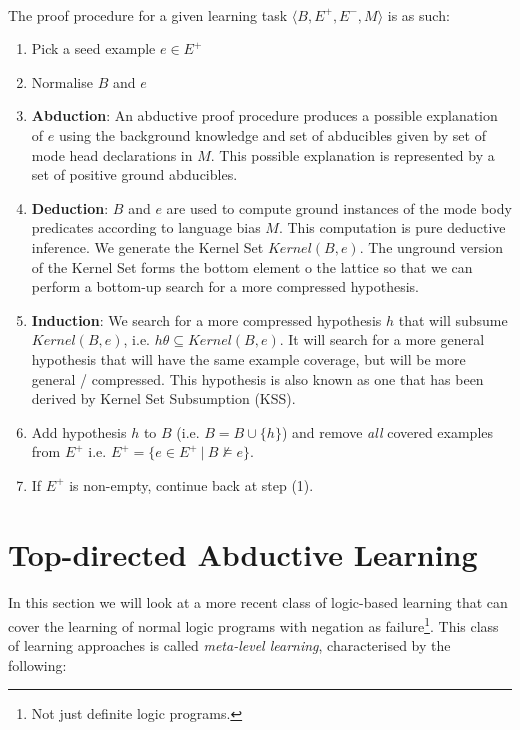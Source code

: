 \documentclass{article}
\theoremstyle{plain}
\theoremstyle{definition}
\begin{document}
\begin{multicols}{2}
\paragraph{} The proof procedure for a given learning task $\langle B, E^+, E^-, M\rangle$ is as such:
\begin{enumerate}
\item Pick a seed example $e \in E^+$
\item Normalise $B$ and $e$
\item \textbf{Abduction}: An abductive proof procedure produces a possible explanation of $e$ using the background knowledge and set of abducibles given by set of mode head declarations in $M$. This possible explanation is represented by a set of positive ground abducibles. 
\item \textbf{Deduction}: $B$ and $e$ are used to compute ground instances of the mode body predicates according to language bias $M$. This computation is pure deductive inference. We generate the Kernel Set $Kernel(B, e)$. The unground version of the Kernel Set forms the bottom element o the lattice so that we can perform a bottom-up search for a more compressed hypothesis. 
\item \textbf{Induction}: We search for a more compressed hypothesis $h$ that will subsume $Kernel(B, e)$, i.e. $h\theta \subseteq Kernel(B, e)$. It will search for a more general hypothesis that will have the same example coverage, but will be more general / compressed. This hypothesis is also known as one that has been derived by Kernel Set Subsumption (KSS).
\item Add hypothesis $h$ to $B$ (i.e. $B = B \cup \{h\}$) and remove \textit{all} covered examples from $E^+$ i.e. $E^+ = \{e \in E^+\ |\ B \not\models e\}$.
\item If $E^+$ is non-empty, continue back at step (1).
\end{enumerate}

\section{Top-directed Abductive Learning}

\paragraph{} In this section we will look at a more recent class of logic-based learning that can cover the learning of normal logic programs with negation as failure\footnote{Not just definite logic programs.}. This class of learning approaches is called \textit{meta-level learning}, characterised by the following:


\end{multicols}
\end{document}
